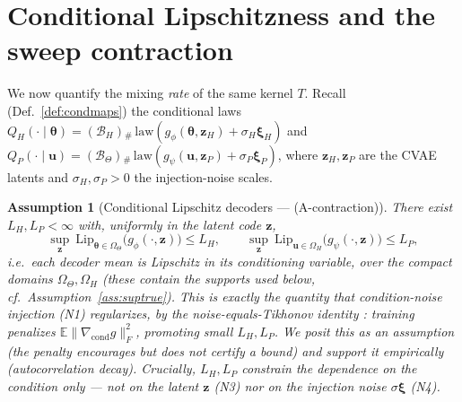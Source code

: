 \documentclass[11pt]{article}
\theoremstyle{definitionbreak}
\newtheorem{assumption}{Assumption}
\theoremstyle{plainbreak}
\theoremstyle{remarkbreak}
\newcommand{\E}{\mathbb{E}}
\newcommand{\Om}{\Omega}
\newcommand{\bth}{\bm{\theta}}
\newcommand{\push}{{}_{\#}}
\begin{document}
\section{Conditional Lipschitzness and the sweep contraction}
\label{sec:contraction}

We now quantify the mixing \emph{rate} of the same kernel $T$. Recall (Def.~\ref{def:condmaps}) the
conditional laws
$Q_H(\cdot\mid\bth)=(\mathcal B_H)\push\,\mathrm{law}(g_\phi(\bth,\bm z_H)+\sigma_H\bm\xi_H)$ and
$Q_P(\cdot\mid\bm u)=(\mathcal B_\Theta)\push\,\mathrm{law}(g_\psi(\bm u,\bm z_P)+\sigma_P\bm\xi_P)$,
where $\bm z_H,\bm z_P$ are the CVAE latents and $\sigma_H,\sigma_P>0$ the injection-noise scales.

\begin{assumption}[Conditional Lipschitz decoders --- (A-contraction)]
\label{ass:lip}
There exist $L_H,L_P<\infty$ with, uniformly in the latent code $\bm z$,
\[
  \sup_{\bm z}\ \mathrm{Lip}_{\bth\in\Om_\Theta}\big(g_\phi(\cdot,\bm z)\big)\le L_H,\qquad
  \sup_{\bm z}\ \mathrm{Lip}_{\bm u\in\Om_H}\big(g_\psi(\cdot,\bm z)\big)\le L_P ,
\]
i.e.\ each decoder mean is Lipschitz in its \emph{conditioning} variable, over the compact domains
$\Om_\Theta,\Om_H$ (these contain the supports used below, cf.\ Assumption~\ref{ass:suptrue}). This is exactly the
quantity that condition-noise injection (N1) regularizes, by the noise-equals-Tikhonov identity
\cite{Bishop}: training penalizes $\E\|\nabla_{\text{cond}}g\|_F^2$, promoting small $L_H,L_P$. We
posit this as an assumption (the penalty encourages but does not certify a bound) and
support it empirically (autocorrelation decay). \emph{Crucially, $L_H,L_P$ constrain the dependence on
the condition only --- not on the latent $\bm z$ (N3) nor on the injection noise $\sigma\bm\xi$ (N4).}
\end{assumption}
\end{document}

